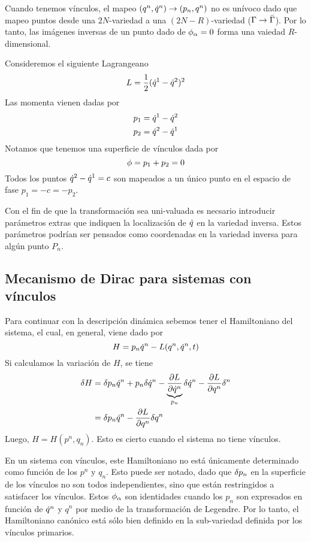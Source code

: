 Cuando tenemos vínculos, el mapeo $(q^n, \dot{q} ^n)\rightarrow (p_n,q^n)$ no es unívoco dado que mapeo puntos desde una $2N$-variedad a una $(2N-R)$-variedad ($\Gamma \rightarrow \bar{\Gamma }$). Por lo tanto, las imágenes inversas de un punto dado de $\phi_\alpha =0$ forma una vaiedad $R$-dimensional.

\begin{ej}
	Consideremos el siguiente Lagrangeano
	\begin{equation}
  L=\frac{1}{2}(\dot{q} ^1-\dot{q}^2)^2
\end{equation}
Las momenta vienen dadas por
\begin{align}
  p_1&=\dot{q}^1-\dot{q}^2\\
  p_2&=\dot{q}^2-\dot{q}^1
\end{align}
Notamos que tenemos una superficie de vínculos dada por
\begin{equation}
  \phi =p_1+p_2=0
\end{equation}
Todos los puntos $\dot{q}^2-\dot{q}^1=c$ son mapeados a un único punto en el espacio de fase $p_1=-c=-p_2$.


\end{ej}


Con el fin de que la transformación sea uni-valuada es necsario introducir parámetros extras que indiquen la localización de $\dot{q}$ en la variedad inversa. Estos parámetros podrían ser pensados como coordenadas en la variedad inversa para algún punto $P_n$.

\subsection{Mecanismo de Dirac para sistemas con vínculos}
Para continuar con la descripción dinámica sebemos tener el Hamiltoniano del sistema, el cual, en general, viene dado por
\begin{equation}
  H=p_n\dot{q}^n -L(q^n,\dot{q}^n,t)
\end{equation}
Si calculamos la variación de $H$, se tiene
\begin{align}
  \delta H&=\delta p_n\dot{q}^n +p_n\delta \dot{q}^n -\underbrace{\pdv{L}{\dot{q}^n }}_{p_n}\delta \dot{q}^n -\pdv{L}{q^n }\delta ^n \\
  &=\delta p_n \dot{q} ^n -\pdv{L}{q^n }\delta q^n  \label{3.1}
\end{align}
Luego, $H=H(p^n ,q_n)$. Esto es cierto cuando el sistema no tiene vínculos. 

En un sistema con vínculos, este Hamiltoniano no está únicamente determinado como función de los $p^n $ y $q_n $. Esto puede ser notado, dado que $\delta p_n $ en la superficie de los vínculos no son todos independientes, sino que están restringidos a satisfacer los vínculos. Estos $\phi_\alpha $ son identidades cuando los $p_n $ son expresados en función de $\dot{q}^n $ y $q^n$ por medio de la transformación de Legendre. Por lo tanto, el Hamiltoniano canónico está sólo bien definido en la sub-variedad definida por los vínculos primarios.

